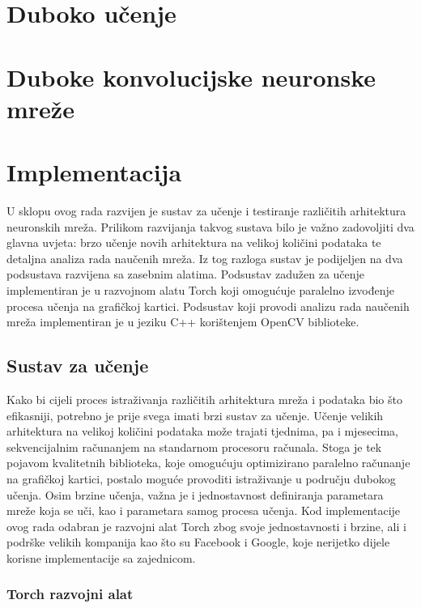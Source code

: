 \documentclass[lmodern, utf8, diplomski, numeric]{fer}
\begin{document}
\chapter{Duboko učenje}



\chapter{Duboke konvolucijske neuronske mreže}

\chapter{Implementacija}

U sklopu ovog rada razvijen je sustav za učenje i testiranje različitih arhitektura neuronskih mreža. Prilikom razvijanja takvog sustava bilo je važno zadovoljiti dva glavna uvjeta: brzo učenje novih arhitektura na velikoj količini podataka te detaljna analiza rada naučenih mreža. Iz tog razloga sustav je podijeljen na dva podsustava razvijena sa zasebnim alatima. Podsustav zadužen za učenje implementiran je u razvojnom alatu Torch koji omogućuje paralelno izvođenje procesa učenja na grafičkoj kartici. Podsustav koji provodi analizu rada naučenih mreža implementiran je u jeziku C++ korištenjem OpenCV biblioteke.

\section{Sustav za učenje}

Kako bi cijeli proces istraživanja različitih arhitektura mreža i podataka bio što efikasniji, potrebno je prije svega imati brzi sustav za učenje. Učenje velikih arhitektura na velikoj količini podataka može trajati tjednima, pa i mjesecima, sekvencijalnim računanjem na standarnom procesoru računala. Stoga je tek pojavom kvalitetnih biblioteka, koje omogućuju optimizirano paralelno računanje na grafičkoj kartici, postalo moguće provoditi istraživanje u području dubokog učenja. 
Osim brzine učenja, važna je i jednostavnost definiranja parametara mreže koja se uči, kao i parametara samog procesa učenja. Kod implementacije ovog rada odabran je razvojni alat Torch zbog svoje jednostavnosti i brzine, ali i podrške velikih kompanija kao što su Facebook i Google, koje nerijetko dijele korisne implementacije sa zajednicom. 

\subsection{Torch razvojni alat}
\end{document}
